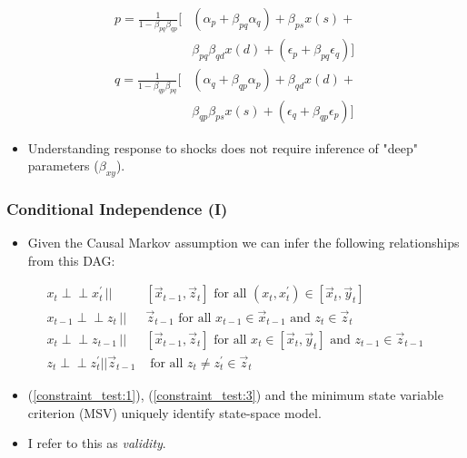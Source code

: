 \documentclass{beamer}
\def\indep{\perp \!\!\! \perp}
\begin{document}
\begin{frame}
\begin{minipage}{0.4\textwidth}
\begin{figure}
        \end{figure}
        \tiny
        \begin{align*}
            p = \frac{1}{1-\beta_{pq}\beta_{qp}}[& (\alpha_p + \beta_{pq} \alpha_q) + \beta_{ps} x(s) + \\ & \beta_{pq} \beta_{qd} x(d) + (\epsilon_p + \beta_{pq} \epsilon_q)] \\
            q = \frac{1}{1-\beta_{qp}\beta_{pq}}[& (\alpha_q + \beta_{qp} \alpha_p) + \beta_{qd} x(d) + \\ & \beta_{qp} \beta_{ps} x(s) + (\epsilon_q + \beta_{qp} \epsilon_p)]
        \end{align*}
    \end{minipage}
    \begin{itemize}
        \item Understanding response to shocks does not require inference of "deep" parameters ($\beta_{xy}$).
    \end{itemize}
\end{frame}

\begin{frame}
    \frametitle{Conditional Independence (I)}
    \begin{itemize}
        \item Given the Causal Markov assumption we can infer the following relationships from this DAG: 
    \end{itemize}
    \begin{align}
        x_t \indep x^{\prime}_{t} \,||\,& [\vec{x}_{t-1},\vec{z}_t] \text{ for all } (x_t, x^{\prime}_{t}) \in [\vec{x}_t, \vec{y}_t] \label{constraint_test:1} \\
        x_{t-1} \indep z_{t} \,||\,& \vec{z}_{t-1} \text{ for all } x_{t-1} \in \vec{x}_{t-1} \text{ and } z_{t} \in \vec{z}_t \label{constraint_test:3} \\
        x_t \indep z_{t-1} \,||\,& [\vec{x}_{t-1}, \vec{z}_t] \text{ for all } x_t \in [\vec{x}_t, \vec{y}_t] \text{ and } z_{t-1} \in \vec{z}_{t-1} \label{constraint_test:2} \\
        z_t \indep z^{\prime}_{t} || \vec{z}_{t-1} & \text{ for all } z_t \not = z^{\prime}_{t} \in \vec{z}_t \label{constraint_test:4}
      \end{align}
    \begin{itemize}
        \item (\ref{constraint_test:1}), (\ref{constraint_test:3}) and the minimum state variable criterion (MSV) \parencite{mccallum1999role} uniquely identify state-space model. 
        \item I refer to this as \textit{validity}.
    \end{itemize}
\end{frame}
\end{document}
